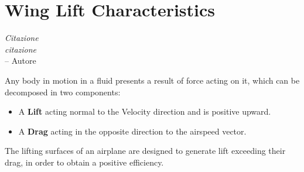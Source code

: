 \chapter{Wing Lift Characteristics}
\label{ch:workobject}

\begin{flushright}
	{\smaller
		\textit{Citazione\\ citazione}\\
		-- Autore}
\end{flushright}


Any body in motion in a fluid presents a result of force acting on it, which can be decomposed in two components:
\begin{itemize}
\item A {\bfseries Lift} acting normal to the Velocity direction and is positive upward.
\item A {\bfseries Drag} acting in the opposite direction to the airspeed vector.
\end{itemize}
The lifting surfaces of an airplane are designed to generate lift exceeding their drag, in order to obtain a positive efficiency.